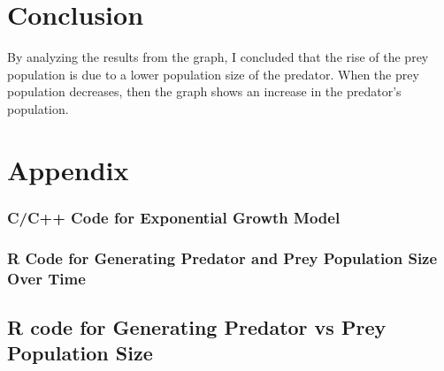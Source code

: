 \documentclass [12pt] {article}
\begin{document}
\section{Conclusion}
By analyzing the results from the graph, I concluded that the rise of the prey population is due to a lower population size of the predator. When the prey population decreases, then the graph shows an increase in the predator's population.
\newpage

\section{Appendix}
\subsubsection{C/C++ Code for Exponential Growth Model}

\subsubsection{R Code for Generating Predator and Prey Population Size Over Time}


\subsection{R code for Generating Predator vs Prey Population Size }

\end{document}
